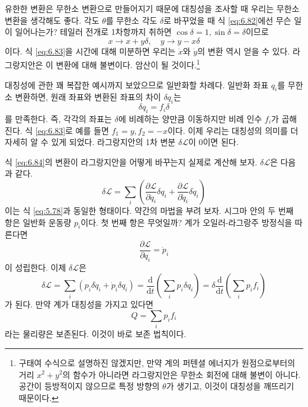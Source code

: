 \documentclass[chapter, oneside, b5paper]{oblivoir}
\theoremstyle{plain}
\theoremstyle{definition}
\theoremstyle{remark}
\begin{document}
유한한 변환은 무한소 변환으로 만들어지기 때문에 대칭성을 조사할 때 우리는 무한소 변환을 생각해도 좋다. 각도 $\theta$를 무한소 각도 $\delta$로 바꾸었을 때 식 \ref{eq:6.82}에선 무슨 일이 일어나는가? 테일러 전개로 1차항까지 취하면 $\cos{\delta} = 1, \sin{\delta} = \delta$이므로
\begin{equation}
    x \to x + y\delta, \quad y \to y-x\delta \label{eq:6.83}
\end{equation}
이다. 식 \ref{eq:6.83}을 시간에 대해 미분하면 우리는 $\dot{x}$와 $\dot{y}$의 변환 역시 얻을 수 있다. 라그랑지안은 이 변환에 대해 불변이다. 암산이 될 것이다.\footnote{구태여 수식으로 설명하진 않겠지만, 만약 계의 퍼텐셜 에너지가 원점으로부터의 거리 $x^2+y^2$의 함수가 아니라면 라그랑지안은 무한소 회전에 대해 불변이 아니다. 공간이 등방적이지 않으므로 특정 방향의 $\theta$가 생기고, 이것이 대칭성을 깨뜨리기 때문이다.}

대칭성에 관한 꽤 복잡한 예시까지 보았으므로 일반화할 차례다. 일반화 좌표 $q_i$를 무한소 변환하면, 원래 좌표와 변환된 좌표의 차이 $\delta q_i$는
\begin{equation}
    \delta q_i = f_i \delta \label{eq:6.84}
\end{equation}
를 만족한다. 즉, 각각의 좌표는 $\delta$에 비례하는 양만큼 이동하지만 비례 인수 $f_i$가 곱해진다. 식 \ref{eq:6.83}로 예를 들면 $f_1 = y, f_2 = -x$이다. 이제 우리는 대칭성의 의미를 더 자세히 알 수 있게 되었다. 라그랑지안의 1차 변분 $\delta \mathcal{L}$이 0이면 된다.

식 \ref{eq:6.84}의 변환이 라그랑지안을 어떻게 바꾸는지 실제로 계산해 보자. $\delta \mathcal{L}$은 다음과 같다.
\begin{equation}
    \delta \mathcal{L} = \sum_i \left( \frac{\partial \mathcal{L}}{\partial q_i} \delta q_i + \frac{\partial \mathcal{L}}{\partial \dot{q}_i} \delta \dot{q}_i \right)
\end{equation}
이는 식 \ref{eq:5.78}과 동일한 형태이다. 약간의 마법을 부려 보자. 시그마 안의 두 번째 항은 일반화 운동량 $p_i$이다. 첫 번째 항은 무엇일까? 계가 오일러-라그랑주 방정식을 따른다면
\begin{equation}
    \frac{\partial \mathcal{L}}{\partial q_i} = \dot{p}_i \label{eq:6.86}
\end{equation}
이 성립한다. 이제 $\delta \mathcal{L}$은
\begin{equation}
    \delta \mathcal{L} = \sum_i \left( p_i \delta \dot{q}_i + \dot{p}_i \delta q_i\right) = \frac{\mathrm{d}}{\mathrm{d}t} \left( \sum_i p_i \delta q_i\right) = \delta \frac{\mathrm{d}}{\mathrm{d}t} \left( \sum_i p_i f_i \right)
\end{equation}
가 된다. 만약 계가 대칭성을 가지고 있다면
\begin{equation}
    Q = \sum_i p_i f_i \label{eq:6.88}
\end{equation}
라는 물리량은 보존된다. 이것이 바로 보존 법칙이다.
\end{document}
